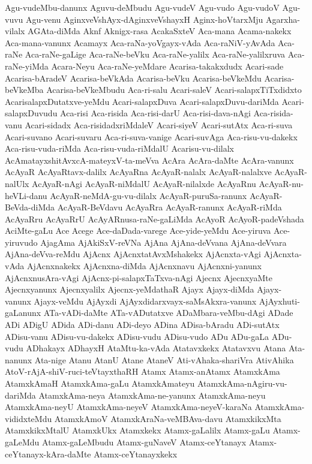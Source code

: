 {Agu-vudeMbu-danunx
Aguvu-deMbudu
Agu-vudeV
Agu-vudo
Agu-vudoV
Agu-vuvu
Agu-venu
AginxveVshAyx-dAginxveVshayxH
Aginx-hoVtarxMju
Agarxha-vilalx
AGAta-diMda
Aknf
Aknigx-rasa
AcakaSxteV
Aca-mana
Acama-nakekx
Aca-mana-vanunx
Acamayx
Aca-raNa-yoVgayx-vAda
Aca-raNiV-yAvAda
Aca-raNe
Aca-raNe-gaLige
Aca-raNe-beVku
Aca-raNe-yalilx
Aca-raNe-yalilxruva
Aca-raNe-yiMda
Acara-Neyu
Aca-raNe-yeMdare
Acarisa-takakxdudx
Acari-sade
Acarisa-bAradeV
Acarisa-beVkAda
Acarisa-beVku
Acarisa-beVkeMdu
Acarisa-beVkeMba
Acarisa-beVkeMbudu
Aca-ri-salu
Acari-saleV
Acari-salapxTiTxdidxto
AcarisalapxDutatxve-yeMdu
Acari-salapxDuva
Acari-salapxDuvu-dariMda
Acari-salapxDuvudu
Aca-risi
Aca-risida
Aca-risi-darU
Aca-risi-dava-nAgi
Aca-risida-vanu
Acari-sidadx
Aca-risidadxriMdaleV
Acari-siyeV
Acari-sutAtx
Aca-ri-suva
Acari-suvano
Acari-suvaru
Aca-ri-suva-vanige
Acari-suvAga
Aca-risu-vu-dakekx
Aca-risu-vuda-riMda
Aca-risu-vuda-riMdalU
Acarisu-vu-dilalx
AcAmatayxshitAvxcA-mateyxV-ta-meVva
AcAra
AcAra-daMte
AcAra-vanunx
AcAyaR
AcAyaRtavx-dalilx
AcAyaRna
AcAyaR-nalalx
AcAyaR-nalalxve
AcAyaR-nalUlx
AcAyaR-nAgi
AcAyaR-niMdalU
AcAyaR-nilalxde
AcAyaRnu
AcAyaR-nu-heVLi-danu
AcAyaR-neMdA-gu-vu-dilalx
AcAyaR-puruSa-ranunx
AcAyaR-BeVda-diMda
AcAyaR-BeVdavu
AcAyaRra
AcAyaR-ranunx
AcAyaR-riMda
AcAyaRru
AcAyaRrU
AcAyARnusa-raNe-gaLiMda
AcAyoR
AcAyoR-padeVshada
AciMte-gaLu
Ace
Acege
Ace-daDada-varege
Ace-yide-yeMdu
Ace-yiruva
Ace-yiruvudo
AjagAma
AjAkiSxV-reVNa
AjAna
AjAna-deVvana
AjAna-deVvara
AjAna-deVva-reMdu
AjAcnx
AjAcnxtatAvxMshakekx
AjAcnxta-vAgi
AjAcnxta-vAda
AjAcnxnakekx
AjAcnxna-diMda
AjAcnxnavu
AjAcnxni-yanunx
AjAcnxnusAra-vAgi
AjAcnx-pi-salapxTaTxva-nAgi
Ajecnx
AjecnxyaMte
Ajecnxyanunx
Ajecnxyalilx
Ajecnx-yeMdathaR
Ajayx
Ajayx-diMda
Ajayx-vanunx
Ajayx-veMdu
AjAyxdi
AjAyxdidarxvayx-saMsAkxra-vanunx
AjAyxhuti-gaLanunx
ATa-vADi-daMte
ATa-vADutatxve
ADaMbara-veMbu-dAgi
ADade
ADi
ADigU
ADida
ADi-danu
ADi-deyo
ADina
ADisa-bAradu
ADi-sutAtx
ADisu-vanu
ADisu-vu-dakekx
ADisu-vudu
ADisu-vudo
ADu
ADu-gaLa
ADu-vudu
ADhakayx
ADhayxH
AtaMtu-ka-vAda
Atatavxkekx
Atatavxvu
Atana
Ata-nanunx
Ata-nige
Atanu
AtanU
Atane
AtaneV
Ati-vAhaka-shariVra
AtivAhika
AtoV-rAjA-shiV-ruci-teVtayxthaRH
Atamx
Atamx-anAtamx
AtamxkAma
AtamxkAmaH
AtamxkAma-gaLu
AtamxkAmateyu
AtamxkAma-nAgiru-vu-dariMda
AtamxkAma-neya
AtamxkAma-ne-yanunx
AtamxkAma-neyu
AtamxkAma-neyU
AtamxkAma-neyeV
AtamxkAma-neyeV-karaNa
AtamxkAma-vididxteMdu
AtamxkAmoV
AtamxkAraNa-veMBAva-davu
AtamxkikxMta
AtamxkikxMtalU
AtamxkUkx
Atamxkekx
Atamx-gaLalilx
Atamx-gaLu
Atamx-gaLeMdu
Atamx-gaLeMbudu
Atamx-guNaveV
Atamx-ceYtanayx
Atamx-ceYtanayx-kAra-daMte
Atamx-ceYtanayxkekx
}
